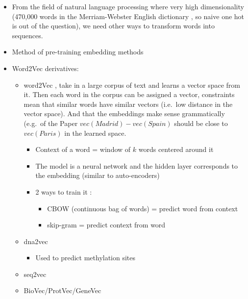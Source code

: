 \documentclass[
  11pt,
  twoside,
  BCOR=10mm,
  listof=totoc]{scrbook}
\providecommand{\tightlist}{%
  \setlength{\itemsep}{0pt}\setlength{\parskip}{0pt}}
\begin{document}
\begin{itemize}
\item
  From the field of natural language processing where very high dimensionality (470,000 words in the Merriam-Webster English dictionary \autocite{HowManyWords}, so naive one hot is out of the question), we need other ways to transform words into sequences.
\item
  Method of pre-training embedding methods
\item
  Word2Vec derivatives:

  \begin{itemize}
  \item
    word2Vec \autocite{mikolovEfficientEstimationWord2013,mikolovDistributedRepresentationsWords2013}, take in a large corpus of text and learns a vector space from it. Then each word in the corpus can be assigned a vector, constraints mean that similar words have similar vectors (i.e.~low distance in the vector space). And that the embeddings make sense grammatically (e.g.~of the Paper \(vec(Madrid) - vec(Spain)\) should be close to \(vec(Paris)\) in the learned space.

    \begin{itemize}
    \item
      Context of a word = window of \(k\) words centered around it
    \item
      The model is a neural network and the hidden layer corresponds to the embedding (similar to auto-encoders)
    \item
      2 ways to train it \autocite{goldbergWord2vecExplainedDeriving2014}:

      \begin{itemize}
      \item
        CBOW (continuous bag of words) = predict word from context
      \item
        skip-gram = predict context from word
      \end{itemize}
    \end{itemize}
  \item
    dna2vec \autocite{ngDna2vecConsistentVector2017}

    \begin{itemize}
    \tightlist
    \item
      Used to predict methylation sites \autocite{liangHyb4mCHybridDNA2vecbased2022}
    \end{itemize}
  \item
    seq2vec \autocite{kimothiDistributedRepresentationsBiological2016}
  \item
    BioVec/ProtVec/GeneVec \autocite{asgariContinuousDistributedRepresentation2015}


\end{itemize}
\end{itemize}
\end{document}
